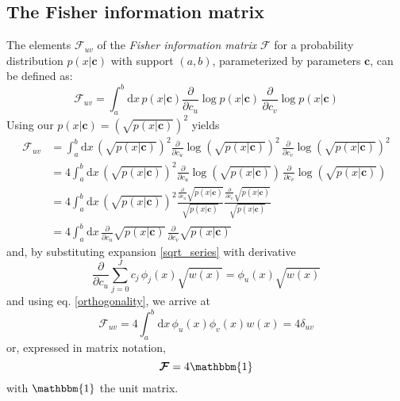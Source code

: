 \documentclass[]{report}
\begin{document}
		\subsection{The Fisher information matrix}
		The elements $\mathcal{F}_{uv}$ of the \emph{Fisher information matrix} $\bm{\mathcal{F}}$ for a probability distribution $p(x\vert\mathbf{c})$ with support $(a,b)$, parameterized by parameters $\mathbf{c}$, can be defined as:
		\begin{equation}
			\mathcal{F}_{uv} = \int_a^b\mathrm{d}x\,p(x\vert\mathbf{c})\frac{\partial}{\partial c_u}\log p(x\vert\mathbf{c})\,\frac{\partial}{\partial c_v}\log p(x\vert\mathbf{c})
		\end{equation}
		Using our $p(x\vert\mathbf{c})=\left(\sqrt{p(x\vert\mathbf{c})}\right)^2$ yields
		\begin{align*}
			\mathcal{F}_{uv} & =  	\int_a^b\mathrm{d}x\,\left(\sqrt{p(x\vert\mathbf{c})}\right)^2\frac{\partial}{\partial c_u}\log \left(\sqrt{p(x\vert\mathbf{c})}\right)^2\,\frac{\partial}{\partial c_v}\log \left(\sqrt{p(x\vert\mathbf{c})}\right)^2 \\
			& =  4\int_a^b\mathrm{d}x\,\left(\sqrt{p(x\vert\mathbf{c})}\right)^2 \frac{\partial}{\partial c_u}\log \left(\sqrt{p(x\vert\mathbf{c})}\right)\,\frac{\partial}{\partial c_v}\log \left(\sqrt{p(x\vert\mathbf{c})}\right) \\
			& =  4 \int_a^b\mathrm{d}x\,\left(\sqrt{p(x\vert\mathbf{c})}\right)^2\frac{\frac{\partial}{\partial c_u}\sqrt{p(x\vert\mathbf{c})}}{\sqrt{p(x\vert\mathbf{c})}}\frac{\frac{\partial}{\partial c_v}\sqrt{p(x\vert\mathbf{c})}}{\sqrt{p(x\vert\mathbf{c})}} \\
			& =  4\int_a^b\mathrm{d}x\,\frac{\partial}{\partial c_u}\sqrt{p(x\vert\mathbf{c})}\,\frac{\partial}{\partial c_v}\sqrt{p(x\vert\mathbf{c})}
		\end{align*}
		and, by substituting expansion \ref{sqrt_series} with derivative
		\begin{equation}\label{gradient_sqrtp}
			\frac{\partial}{\partial c_u}\sum_{j=0}^{J}c_j\,\phi_j(x)\sqrt{w(x)} = \phi_u(x)\sqrt{w(x)}
		\end{equation}
		and using eq. \ref{orthogonality}, we arrive at
		\begin{equation*}
			\mathcal{F}_{uv} = 4\int_a^b\mathrm{d}x\,\phi_u(x)\phi_v(x)w(x) = 4\delta_{uv}
		\end{equation*}
		or, expressed in matrix notation,
		\begin{equation}\label{fisher_direct}
			\bm{\mathcal{F}} = 4\mathbbm{1}
		\end{equation}
		with $\mathbbm{1}$ the unit matrix.
		
\end{document}
